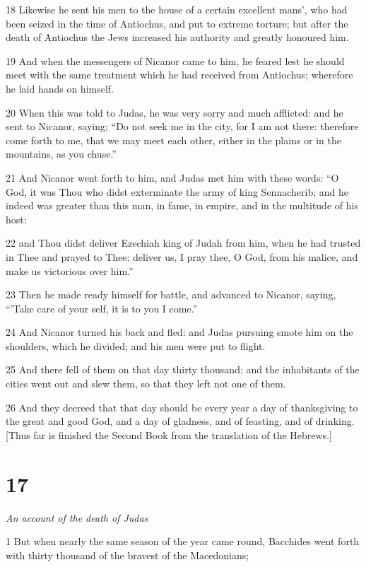 18 Likewise he sent his men to the house of a certain excellent mans’, who had been seized in the time of Antiochus, and put to extreme torture; but after the death of Antiochus the Jews increased his authority and greatly honoured him. 

19 And when the messengers of Nicanor came to him, he feared lest he should meet with the same treatment which he had received from Antiochus; wherefore he laid hands on himself. 

20 When this was told to Judas, he was very sorry and much afflicted: and he sent to Nicanor, saying; “Do not seek me in the city, for I am not there: therefore come forth to me, that we may meet each other, either in the plains or in the mountains, as you chuse.” 

21 And Nicanor went forth to him, and Judas met him with these words: “O God, it was Thou who didst exterminate the army of king Sennacherib; and he indeed was greater than this man, in fame, in empire, and in the multitude of his host: 

22 and Thou didst deliver Ezechiah king of Judah from him, when he had trusted in Thee and prayed to Thee: deliver us, I pray thee, O God, from his malice, and make us victorious over him.” 

23 Then he made ready himself for battle, and advanced to Nicanor, saying, “'Take care of your self, it is to you I come.” 

24 And Nicanor turned his back and fled: and Judas pursuing smote him on the shoulders, which he divided; and his men were put to flight. 

25 And there fell of them on that day thirty thousand: and the inhabitants of the cities went out and slew them, so that they left not one of them.

26 And they decreed that that day should be every year a day of thanksgiving to the great and good God, and a day of gladness, and of feasting, and of drinking. [Thus far is finished the Second Book from the translation of the Hebrews.] 

\chapter{17}

\par \textit{An account of the death of Judas}

1 But when nearly the same season of the year came round, Bacchides went forth with thirty thousand of the bravest of the Macedonians; 

